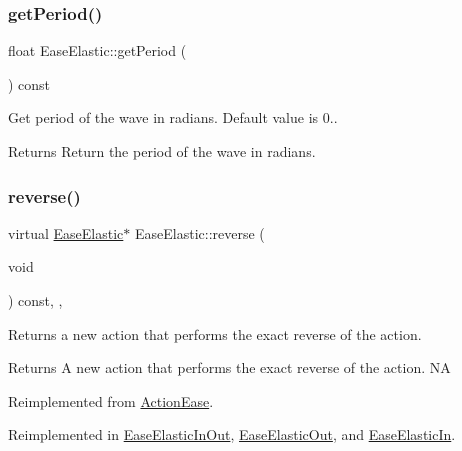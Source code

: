 \subsubsection{\texorpdfstring{get\+Period()}{getPeriod()}\hspace{0.1cm}{\footnotesize\ttfamily [2/2]}}
{\footnotesize\ttfamily float Ease\+Elastic\+::get\+Period (\begin{DoxyParamCaption}{ }\end{DoxyParamCaption}) const\hspace{0.3cm}{\ttfamily [inline]}}



Get period of the wave in radians. Default value is 0.. 

\begin{DoxyReturn}{Returns}
Return the period of the wave in radians. 
\end{DoxyReturn}
\mbox{\label{classEaseElastic_a9e0e8c55fbe1c50c706dd3d62834ed82}} 
\subsubsection{\texorpdfstring{reverse()}{reverse()}}
{\footnotesize\ttfamily virtual \hyperlink{classEaseElastic}{Ease\+Elastic}$\ast$ Ease\+Elastic\+::reverse (\begin{DoxyParamCaption}\item[{void}]{ }\end{DoxyParamCaption}) const\hspace{0.3cm}{\ttfamily [inline]}, {\ttfamily [override]}, {\ttfamily [virtual]}}

Returns a new action that performs the exact reverse of the action.

\begin{DoxyReturn}{Returns}
A new action that performs the exact reverse of the action.  NA 
\end{DoxyReturn}


Reimplemented from \hyperlink{classActionEase_ab99eb083fa033fae1d6c948fdc730782}{Action\+Ease}.



Reimplemented in \hyperlink{classEaseElasticInOut_a08123565179ad98702f27561605dabae}{Ease\+Elastic\+In\+Out}, \hyperlink{classEaseElasticOut_a3da4544ffa360bd28296d2e120b2fdc9}{Ease\+Elastic\+Out}, and \hyperlink{classEaseElasticIn_ae29b6a632f6721e3b43786df80b86cc1}{Ease\+Elastic\+In}.

